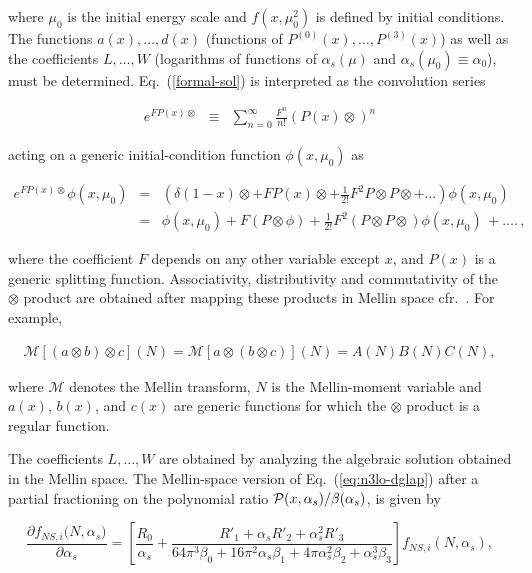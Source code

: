\documentclass[12pt,notitlepage,aps,preprintnumbers,superscriptaddress,nofootinbib,aps,prd,floatfix]{revtex4-2}
\renewenvironment{eqnarray}{\begin{equation}\begin{aligned}}
{\end{aligned}\end{equation}}
\newcommand{\ddp}{\partial}
\begin{document}
where $\mu_0$ is the initial energy scale and $f(x,\mu_0^2)$ is defined by initial conditions. The functions $a(x), \dots, d(x)$ (functions of $P^{(0)}(x), \dots, P^{(3)}(x)$) as well as the coefficients $L,\dots,W$ (logarithms of functions of $\alpha_s(\mu)$ and $\alpha_s(\mu_0)\equiv \alpha_0$), must be determined. 
Eq.~(\ref{formal-sol}) is interpreted as the convolution series 

\begin{eqnarray}
e^{F P(x)\otimes} &\equiv& \sum_{n=0}^\infty \frac{F^n}{n!}\left(P(x)\otimes\right)^n
\end{eqnarray}

acting on a generic initial-condition function 
$\phi(x,\mu_0)$ as

\begin{eqnarray}
e^{F P(x)\otimes}\phi(x,\mu_0)&=&
\left( \delta(1-x)\otimes + F P(x)\otimes + \frac{1}{2!}F^2 P\otimes P\otimes
+ \dots\right)\phi(x,\mu_0) \nonumber \\
&=&
\phi(x,\mu_0) +  F \left(P \otimes \phi\right) + \frac{1}{2!}F^2 \left(P \otimes P \otimes \right)\phi(x,\mu_0)
\,+ \dots.\,,
\end{eqnarray}

where the coefficient $F$ depends on any other variable except $x$, and $P(x)$ is a generic splitting function. Associativity, distributivity and commutativity of the $\otimes$ product are obtained after mapping these products in Mellin space cfr.~\cite{Cafarella:2005zj}. For example,

\begin{eqnarray}
\mathcal{M}\left[\left(a\otimes b\right)\otimes c\right](N)=\mathcal{M}\left[ a\otimes \left(b\otimes c\right)\right](N) = A(N) B(N) C(N),
\end{eqnarray}

where $\mathcal{M}$ denotes the Mellin transform, $N$ is the Mellin-moment variable 
and $a(x)$, $b(x)$, and $c(x)$ are generic functions for which the $\otimes$ product is a regular function.  

The coefficients $L, \dots, W$ are obtained by analyzing the algebraic solution obtained in the Mellin space. The Mellin-space version of Eq.~(\ref{eq:n3lo-dglap}) after a partial fractioning on the polynomial ratio ${\cal P}(x,\alpha_s)/\beta(\alpha_s)$, is given by  

\begin{equation}
\frac{\ddp{f_{NS,i}(N,\alpha_s})}{\ddp{\alpha_s}} = \left[ \frac{R_0}{\alpha_s} + \frac{R'_1 + \alpha_s R'_2 + \alpha_s^2 R'_3}{64\pi^3\beta_0 + 16\pi^2\alpha_s \beta_1 + 4\pi \alpha_s^2 \beta_2 + \alpha_s^3 \beta_3} \right] f_{NS,i}(N,\alpha_s),
\label{eq:n3lo-dglap-apart}
\end{equation}
\end{document}
